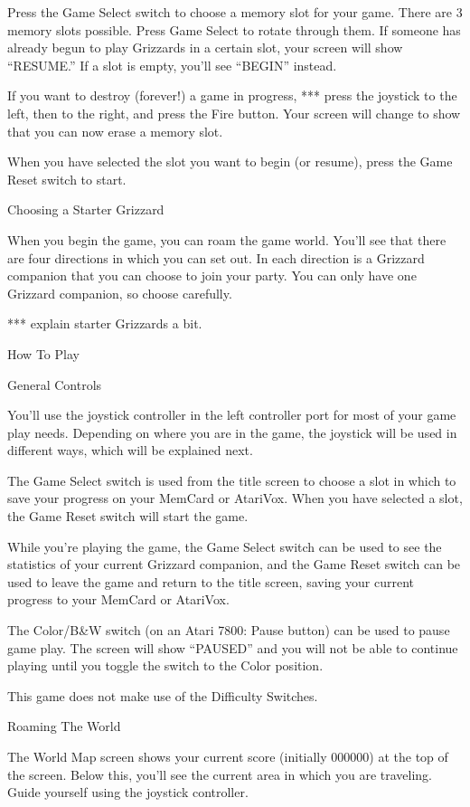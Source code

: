 \documentclass[10pt,twoside,openright]{memoir}
\begin{document}
Press the Game Select switch to choose a memory slot for your game. There
are 3 memory slots possible. Press Game Select to rotate through them. If
someone has already begun to play Grizzards in a certain slot, your screen
will show ``RESUME.'' If a slot is empty, you'll see ``BEGIN'' instead.

If you want to destroy (forever!) a game in progress, *** press the joystick
to the left, then to the right, and press the Fire button. Your screen will
change to show that you can now erase a memory slot. 

When you have selected the slot you want to begin (or resume), press the
Game Reset switch to start.

Choosing a Starter Grizzard

When you begin the game, you can roam the game world. You'll see that there
are four directions in which you can set out. In each direction is a
Grizzard companion that you can choose to join your party. You can only have
one Grizzard companion, so choose carefully. 

*** explain starter Grizzards a bit.


How To Play

General Controls

You'll use the joystick controller in the left controller port for most of
your game play needs. Depending on where you are in the game, the joystick
will be used in different ways, which will be explained next.

The Game Select switch is used from the title screen to choose a slot in
which to save your progress on your MemCard or AtariVox. When you have
selected a slot, the Game Reset switch will start the game.

While you're playing the game, the Game Select switch can be used to see the
statistics of your current Grizzard companion, and the Game Reset switch can
be used to leave the game and return to the title screen, saving your
current progress to your MemCard or AtariVox.

The Color/B&W switch (on an Atari 7800: Pause button) can be used to pause
game play. The screen will show ``PAUSED'' and you will not be able to
continue playing until you toggle the switch to the Color position.

This game does not make use of the Difficulty Switches.


Roaming The World

The World Map screen shows your current score (initially 000000) at the top
of the screen.  Below this, you'll see the current area in which you are
traveling.  Guide yourself using the joystick controller.
\end{document}
